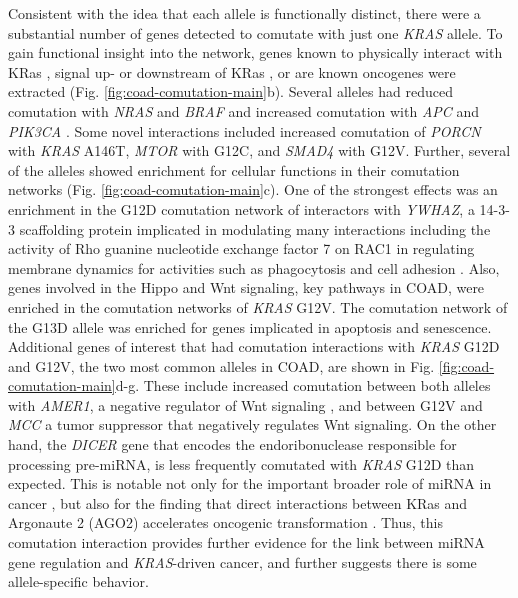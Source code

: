 \documentclass[english, 10pt, letterpaper]{article}
\newcommand{\KRAS}{\emph{KRAS}}
\newcommand{\kras}{KRas}
\begin{document}
Consistent with the idea that each allele is functionally distinct, there were a substantial number of genes detected to comutate with just one \KRAS{} allele.
To gain functional insight into the network, genes known to physically interact with \kras{} \cite{Kovalski2019}, signal up- or downstream of \kras{} \cite{Kanehisa2017, Kanehisa2016KEGGAnnotation.}, or are known oncogenes \cite{Bamford2004TheWebsite., Sondka2018} were extracted (Fig. \ref{fig:coad-comutation-main}b).
Several alleles had reduced comutation with \emph{NRAS} and \emph{BRAF} and increased comutation with \emph{APC} and \emph{PIK3CA} \cite{Sensi2006MutuallyMelanoma., Jauhri2017, Seth2009ConcomitantCancer., Cisowski2016, Janssen2006, Sakai2018, Kennedy2011, Wang2013, Green2015, Yeang2008CombinatorialCancer., CancerGenomeAtlasNetwork2012}. 
Some novel interactions included increased comutation of \emph{PORCN} with \KRAS{} A146T, \emph{MTOR} with G12C, and \emph{SMAD4} with G12V.
Further, several of the alleles showed enrichment for cellular functions in their comutation networks (Fig. \ref{fig:coad-comutation-main}c).
One of the strongest effects was an enrichment in the G12D comutation network of interactors with \emph{YWHAZ}, a 14-3-3 scaffolding protein implicated in modulating many interactions including the activity of Rho guanine nucleotide exchange factor 7 on RAC1 in regulating membrane dynamics for activities such as phagocytosis and cell adhesion \cite{Angrand2006TransgenicSignaling.}.
Also, genes involved in the Hippo and Wnt signaling, key pathways in COAD, were enriched in the comutation networks of \KRAS{} G12V.
The comutation network of the G13D allele was enriched for genes implicated in apoptosis and senescence.
Additional genes of interest that had comutation interactions with \KRAS{} G12D and G12V, the two most common alleles in COAD, are shown in Fig. \ref{fig:coad-comutation-main}d-g.
These include increased comutation between both alleles with \emph{AMER1}, a negative regulator of Wnt signaling \cite{Grohmann2007AMER1Membrane., Tanneberger2011StructuralAmer1.}, and between G12V and \emph{MCC} a tumor suppressor that negatively regulates Wnt signaling.
On the other hand, the \emph{DICER} gene that encodes the endoribonuclease responsible for processing pre-miRNA, is less frequently comutated with \KRAS{} G12D than expected.
This is notable not only for the important broader role of miRNA in cancer \cite{Svoronos2016OncomiRCancer., Anastasiadou2018Non-codingCancer.}, but also for the finding that direct interactions between \kras{} and Argonaute 2 (AGO2) accelerates oncogenic transformation \cite{Shankar2016KRASTransformation.}.
Thus, this comutation interaction provides further evidence for the link between miRNA gene regulation and \KRAS{}-driven cancer, and further suggests there is some allele-specific behavior.
\end{document}
